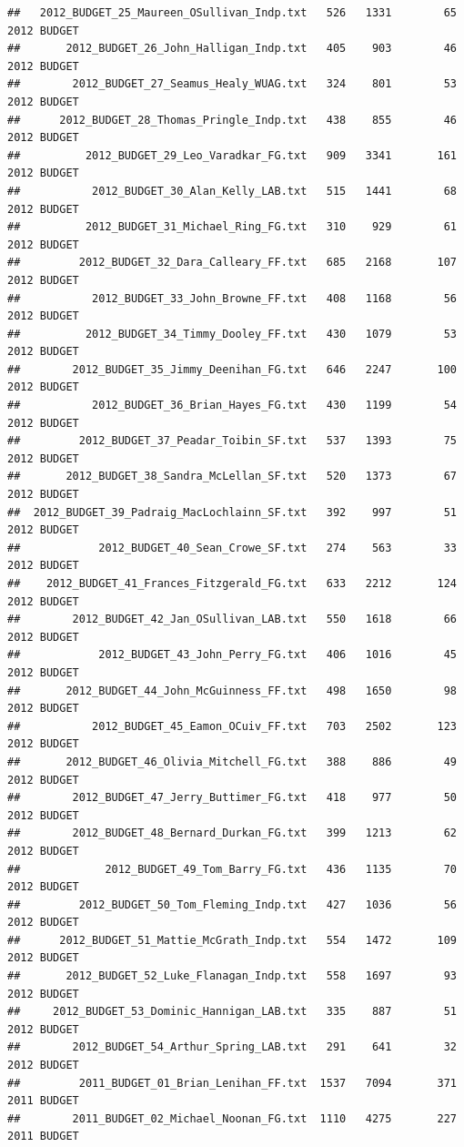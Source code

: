 \documentclass[11pt]{article}\usepackage[]{graphicx}\usepackage[]{color}
\makeatletter
\newenvironment{kframe}{%
 \def\at@end@of@kframe{}%
 \ifinner\ifhmode%
  \def\at@end@of@kframe{\end{minipage}}%
  \begin{minipage}{\columnwidth}%
 \fi\fi%
 \def\FrameCommand##1{\hskip\@totalleftmargin \hskip-\fboxsep
 \colorbox{shadecolor}{##1}\hskip-\fboxsep
     \hskip-\linewidth \hskip-\@totalleftmargin \hskip\columnwidth}%
 \MakeFramed {\advance\hsize-\width
   \@totalleftmargin\z@ \linewidth\hsize
   \@setminipage}}%
 {\par\unskip\endMakeFramed%
 \at@end@of@kframe}
\newenvironment{knitrout}{}{} %
\makeatother
\begin{document}
\begin{knitrout}
\begin{kframe}
\begin{verbatim}
##   2012_BUDGET_25_Maureen_OSullivan_Indp.txt   526   1331        65 2012 BUDGET
##       2012_BUDGET_26_John_Halligan_Indp.txt   405    903        46 2012 BUDGET
##        2012_BUDGET_27_Seamus_Healy_WUAG.txt   324    801        53 2012 BUDGET
##      2012_BUDGET_28_Thomas_Pringle_Indp.txt   438    855        46 2012 BUDGET
##          2012_BUDGET_29_Leo_Varadkar_FG.txt   909   3341       161 2012 BUDGET
##           2012_BUDGET_30_Alan_Kelly_LAB.txt   515   1441        68 2012 BUDGET
##          2012_BUDGET_31_Michael_Ring_FG.txt   310    929        61 2012 BUDGET
##         2012_BUDGET_32_Dara_Calleary_FF.txt   685   2168       107 2012 BUDGET
##           2012_BUDGET_33_John_Browne_FF.txt   408   1168        56 2012 BUDGET
##          2012_BUDGET_34_Timmy_Dooley_FF.txt   430   1079        53 2012 BUDGET
##        2012_BUDGET_35_Jimmy_Deenihan_FG.txt   646   2247       100 2012 BUDGET
##           2012_BUDGET_36_Brian_Hayes_FG.txt   430   1199        54 2012 BUDGET
##         2012_BUDGET_37_Peadar_Toibin_SF.txt   537   1393        75 2012 BUDGET
##       2012_BUDGET_38_Sandra_McLellan_SF.txt   520   1373        67 2012 BUDGET
##  2012_BUDGET_39_Padraig_MacLochlainn_SF.txt   392    997        51 2012 BUDGET
##            2012_BUDGET_40_Sean_Crowe_SF.txt   274    563        33 2012 BUDGET
##    2012_BUDGET_41_Frances_Fitzgerald_FG.txt   633   2212       124 2012 BUDGET
##        2012_BUDGET_42_Jan_OSullivan_LAB.txt   550   1618        66 2012 BUDGET
##            2012_BUDGET_43_John_Perry_FG.txt   406   1016        45 2012 BUDGET
##       2012_BUDGET_44_John_McGuinness_FF.txt   498   1650        98 2012 BUDGET
##           2012_BUDGET_45_Eamon_OCuiv_FF.txt   703   2502       123 2012 BUDGET
##       2012_BUDGET_46_Olivia_Mitchell_FG.txt   388    886        49 2012 BUDGET
##        2012_BUDGET_47_Jerry_Buttimer_FG.txt   418    977        50 2012 BUDGET
##        2012_BUDGET_48_Bernard_Durkan_FG.txt   399   1213        62 2012 BUDGET
##             2012_BUDGET_49_Tom_Barry_FG.txt   436   1135        70 2012 BUDGET
##         2012_BUDGET_50_Tom_Fleming_Indp.txt   427   1036        56 2012 BUDGET
##      2012_BUDGET_51_Mattie_McGrath_Indp.txt   554   1472       109 2012 BUDGET
##       2012_BUDGET_52_Luke_Flanagan_Indp.txt   558   1697        93 2012 BUDGET
##     2012_BUDGET_53_Dominic_Hannigan_LAB.txt   335    887        51 2012 BUDGET
##        2012_BUDGET_54_Arthur_Spring_LAB.txt   291    641        32 2012 BUDGET
##         2011_BUDGET_01_Brian_Lenihan_FF.txt  1537   7094       371 2011 BUDGET
##        2011_BUDGET_02_Michael_Noonan_FG.txt  1110   4275       227 2011 BUDGET

\end{verbatim}
\end{kframe}
\end{knitrout}
\end{document}
